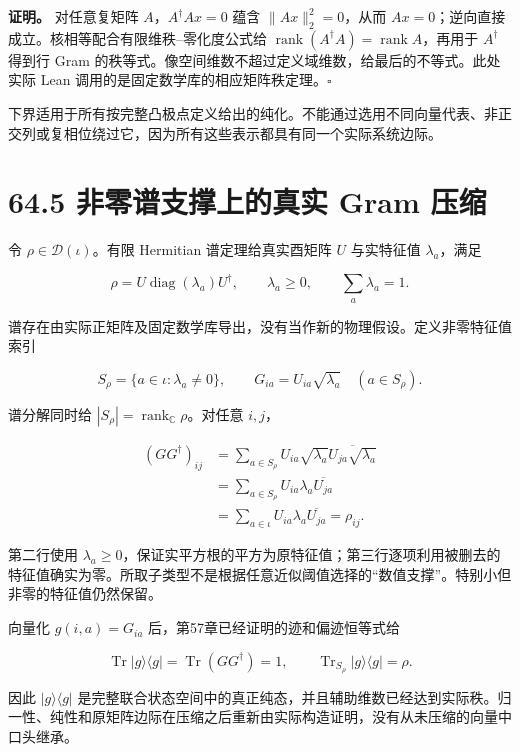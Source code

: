 \documentclass[
  11pt,
  oneside]{book}
\begin{document}
\textbf{证明。} 对任意复矩阵 \(A\)，\(A^\dagger A x=0\) 蕴含
\(\|Ax\|_2^2=0\)，从而
\(Ax=0\)；逆向直接成立。核相等配合有限维秩--零化度公式给
\(\operatorname{rank}(A^\dagger A)=\operatorname{rank}A\)，再用于
\(A^\dagger\) 得到行 Gram
的秩等式。像空间维数不超过定义域维数，给最后的不等式。此处实际 Lean
调用的是固定数学库的相应矩阵秩定理。\(\square\)

下界适用于所有按完整凸极点定义给出的纯化。不能通过选用不同向量代表、非正交列或复相位绕过它，因为所有这些表示都具有同一个实际系统边际。

\section{64.5 非零谱支撑上的真实 Gram 压缩}

令 \(\rho\in\mathcal D(\iota)\)。有限 Hermitian 谱定理给真实酉矩阵 \(U\)
与实特征值 \(\lambda_a\)，满足

\[
\rho=U\operatorname{diag}(\lambda_a)U^\dagger,
\qquad \lambda_a\ge0,
\qquad \sum_a\lambda_a=1.
\]

谱存在由实际正矩阵及固定数学库导出，没有当作新的物理假设。定义非零特征值索引

\[
S_\rho=\{a\in\iota:\lambda_a\ne0\},
\qquad
G_{ia}=U_{ia}\sqrt{\lambda_a}\quad(a\in S_\rho).
\]

谱分解同时给 \(|S_\rho|=\operatorname{rank}_{\mathbb C}\rho\)。对任意
\(i,j\)，

\[
\begin{aligned}
(GG^\dagger)_{ij}
&=\sum_{a\in S_\rho}U_{ia}\sqrt{\lambda_a}
  \overline{U_{ja}\sqrt{\lambda_a}}\\
&=\sum_{a\in S_\rho}U_{ia}\lambda_a\overline{U_{ja}}\\
&=\sum_{a\in\iota}U_{ia}\lambda_a\overline{U_{ja}}
=\rho_{ij}.
\end{aligned}
\]

第二行使用
\(\lambda_a\ge0\)，保证实平方根的平方为原特征值；第三行逐项利用被删去的特征值确实为零。所取子类型不是根据任意近似阈值选择的``数值支撑''。特别小但非零的特征值仍然保留。

向量化 \(g(i,a)=G_{ia}\) 后，第57章已经证明的迹和偏迹恒等式给

\[
\operatorname{Tr}|g\rangle\langle g|
=\operatorname{Tr}(GG^\dagger)=1,
\qquad
\operatorname{Tr}_{S_\rho}|g\rangle\langle g|=\rho.
\]

因此 \(|g\rangle\langle g|\)
是完整联合状态空间中的真正纯态，并且辅助维数已经达到实际秩。归一性、纯性和原矩阵边际在压缩之后重新由实际构造证明，没有从未压缩的向量中口头继承。
\end{document}
